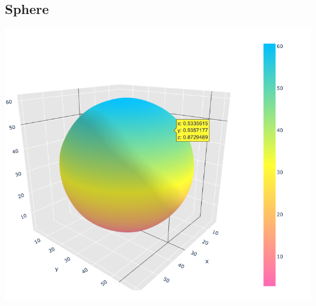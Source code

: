 \documentclass{article}
\begin{document}
\subsection*{Sphere}
\includegraphics[scale=0.4]{images/sphere_mls}
\end{document}
